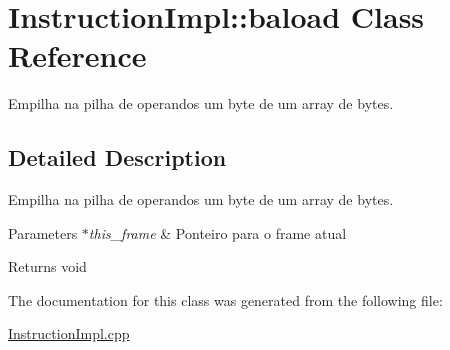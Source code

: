 \hypertarget{class_instruction_impl_1_1baload}{}\section{Instruction\+Impl\+:\+:baload Class Reference}
\label{class_instruction_impl_1_1baload}


Empilha na pilha de operandos um byte de um array de bytes.  




\subsection{Detailed Description}
Empilha na pilha de operandos um byte de um array de bytes. 


\begin{DoxyParams}{Parameters}
{\em $\ast$this\+\_\+frame} & Ponteiro para o frame atual \\
\hline
\end{DoxyParams}
\begin{DoxyReturn}{Returns}
void 
\end{DoxyReturn}


The documentation for this class was generated from the following file\+:\begin{DoxyCompactItemize}
\item 
\hyperlink{_instruction_impl_8cpp}{Instruction\+Impl.\+cpp}\end{DoxyCompactItemize}
